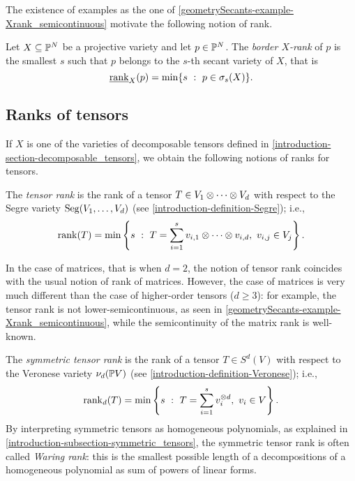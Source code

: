  The existence of examples as the one of \ref{geometrySecants-example-Xrank_semicontinuous} motivate the following notion of rank.

 \begin{definition}
     \label{geometrySecants-definition-border_rank}
     Let $X \subseteq \mathbb{P}^N$ be a projective variety and let $p \in \mathbb{P}^N$. The \emph{border $X$-rank} of $p$ is the smallest $s$ such that $p$ belongs to the $s$-th secant variety of $X$, that is 
     \[
         \underline{\mathrm{rank}}_X(p) = \min\{s ~:~ p \in \sigma_s(X)\}.
     \]
 \end{definition}
 
 
 \subsection{Ranks of tensors}
 If $X$ is one of the varieties of decomposable tensors defined in \ref{introduction-section-decomposable_tensors}, we obtain the following notions of ranks for tensors.
 
 \begin{definition}
 \label{geometrySecants-definition-tensor_rank}
     The \emph{tensor rank} is the rank of a tensor $T \in V_1 \otimes \cdots \otimes V_d$ with respect to the Segre variety $\mathrm{Seg}(V_1,\ldots,V_d)$ (see \ref{introduction-definition-Segre}); i.e., 
     \[
         \mathrm{rank}(T) = \min\left\{s ~:~ T = \sum_{i=1}^s v_{i,1}\otimes \cdots \otimes v_{i,d}, ~ v_{i,j} \in V_j\right\}.
     \]
     \begin{example}
         In the case of matrices, that is when $d=2$, the notion of tensor rank coincides with the usual notion of rank of matrices. However, the case of matrices is very much different than the case of higher-order tensors ($d\geq 3$): for example, the tensor rank is not lower-semicontinuous, as seen in \ref{geometrySecants-example-Xrank_semicontinuous}, while the semicontinuity of the matrix rank is well-known. 
     \end{example}
 \end{definition}
 
 \begin{definition}
 \label{geometrySecants-definition-symmetric_tensor_rank}
     The \emph{symmetric tensor rank} is the rank of a tensor $T \in S^d(V)$ with respect to the Veronese variety $\nu_d(\mathbb{P} V)$ (see \ref{introduction-definition-Veronese}); i.e., 
     \[
         \mathrm{rank}_d(T) = \min\left\{s ~:~ T = \sum_{i=1}^s v_{i}^{\otimes d}, ~ v_{i} \in V\right\}.
     \]
     By interpreting symmetric tensors as homogeneous polynomials, as explained in \ref{introduction-subsection-symmetric_tensors}, the symmetric tensor rank is often called \emph{Waring rank}: this is the smallest possible length of a decompositions of a homogeneous polynomial as sum of powers of linear forms.
 \end{definition}  
 
